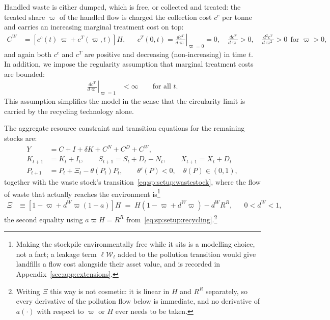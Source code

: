 Handled waste is either dumped, which is free, or collected and treated: the treated share $\varpi$ of the handled flow is charged the collection cost $c^c$ per tonne and carries an increasing marginal treatment cost on top:
\begin{align}
C^W &= \left[c^c(t)\,\varpi+c^T(\varpi,t)\right]H,
&&
c^T(0,t)=\left.\frac{dc^T}{d\varpi}\right|_{\varpi=0}=0,\quad
\frac{dc^T}{d\varpi}>0,\quad \frac{d^2c^T}{d\varpi^2}>0 \ \ \text{for }\varpi>0,
\label{eq:sp:setup:waste-cost}
\end{align}
and again both $c^c$ and $c^T$ are positive and decreasing (non-increasing) in time $t$. In addition, we impose the regularity assumption that marginal treatment costs are bounded:
\begin{align}
\left.\frac{dc^T}{d\varpi}\right|_{\varpi=1} &< \infty \qquad\text{for all }t .
\label{eq:sp:setup:cT-finite}
\end{align}
This assumption simplifies the model in the sense that the circularity limit is carried by the recycling technology alone.


 The aggregate resource constraint and transition equations for the remaining stocks are:
\begin{align}
Y &= C+I+\delta K+C^N+C^D+C^W, \label{eq:sp:setup:resource-constraint} \\
K_{t+1} &= K_t+I_t, \qquad S_{t+1}= S_t+D_t-N_t, \qquad X_{t+1} = X_t+D_t \label{eq:sp:setup:reserves-motion} \\
P_{t+1} &= P_t+\Xi_t-\theta(P_t)P_t, \qquad \theta'(P)<0, \quad \theta(P)\in\left(0,1\right),
\label{eq:sp:setup:pollution-motion}
\end{align}
together with the waste stock's transition~\eqref{eq:sp:setup:wastestock}, where the flow of waste that actually reaches the environment is\footnote{Making the stockpile environmentally free while it sits is a modelling choice, not a fact; a leakage term $\ell\mathcal W_t$ added to the pollution transition would give landfills a flow cost alongside their asset value, and is recorded in Appendix~\ref{sec:app:extensions}.}
\begin{align}
\Xi &\equiv \left[1-\varpi+d^W\varpi\left(1-a\right)\right]H
\;=\; H\left(1-\varpi+d^W\varpi\right)-d^WR^R,
&&
0<d^W<1,
\label{eq:sp:setup:Xi}
\end{align}
the second equality using $a\varpi H=R^R$ from~\eqref{eq:sp:setup:recycling}.\footnote{Writing $\Xi$ this way is not cosmetic: it is linear in $H$ and $R^R$ separately, so every derivative of the pollution flow below is immediate, and no derivative of $a(\cdot)$ with respect to $\varpi$ or $H$ ever needs to be taken.}


